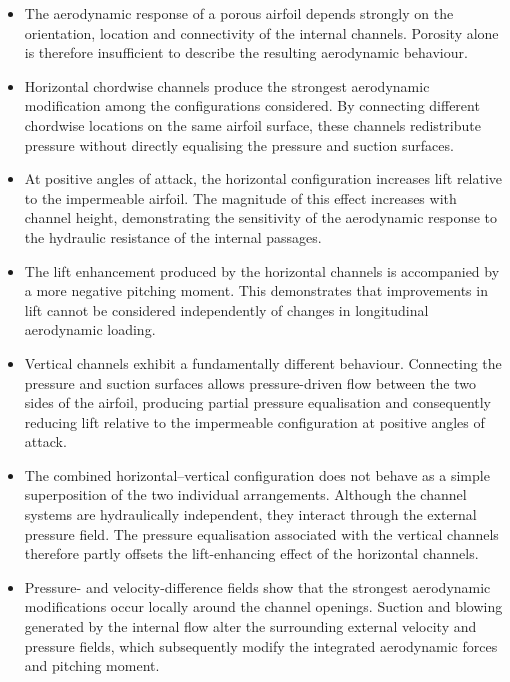 \documentclass[a4paper,fleqn]{cas-dc}
\begin{document}
	\begin{itemize}
		
		\item The aerodynamic response of a porous airfoil depends strongly on
		the orientation, location and connectivity of the internal channels.
		Porosity alone is therefore insufficient to describe the resulting
		aerodynamic behaviour.
		
		\item Horizontal chordwise channels produce the strongest aerodynamic
		modification among the configurations considered. By connecting
		different chordwise locations on the same airfoil surface, these channels
		redistribute pressure without directly equalising the pressure and
		suction surfaces.
		
		\item At positive angles of attack, the horizontal configuration
		increases lift relative to the impermeable airfoil. The magnitude of this
		effect increases with channel height, demonstrating the sensitivity of
		the aerodynamic response to the hydraulic resistance of the internal
		passages.
		
		\item The lift enhancement produced by the horizontal channels is
		accompanied by a more negative pitching moment. This demonstrates that
		improvements in lift cannot be considered independently of changes in
		longitudinal aerodynamic loading.
		
		\item Vertical channels exhibit a fundamentally different behaviour.
		Connecting the pressure and suction surfaces allows pressure-driven flow
		between the two sides of the airfoil, producing partial pressure
		equalisation and consequently reducing lift relative to the impermeable
		configuration at positive angles of attack.
		
		\item The combined horizontal--vertical configuration does not behave as
		a simple superposition of the two individual arrangements. Although the
		channel systems are hydraulically independent, they interact through the
		external pressure field. The pressure equalisation associated with the
		vertical channels therefore partly offsets the lift-enhancing effect of
		the horizontal channels.
		
		\item Pressure- and velocity-difference fields show that the strongest
		aerodynamic modifications occur locally around the channel openings.
		Suction and blowing generated by the internal flow alter the surrounding
		external velocity and pressure fields, which subsequently modify the
		integrated aerodynamic forces and pitching moment.
		

\end{itemize}
\end{document}
